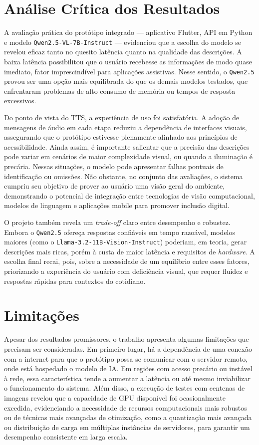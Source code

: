 \section{Análise Crítica dos Resultados}

A avaliação prática do protótipo integrado — aplicativo Flutter, API em Python e modelo \lstinline{Qwen2.5-VL-7B-Instruct} — evidenciou que a escolha do modelo se revelou eficaz tanto no quesito latência quanto na qualidade das descrições. A baixa latência possibilitou que o usuário recebesse as informações de modo quase imediato, fator imprescindível para aplicações assistivas. Nesse sentido, o \lstinline{Qwen2.5} provou ser uma opção mais equilibrada do que os demais modelos testados, que enfrentaram problemas de alto consumo de memória ou tempos de resposta excessivos.

Do ponto de vista do TTS, a experiência de uso foi satisfatória. A adoção de mensagens de áudio em cada etapa reduziu a dependência de interfaces visuais, assegurando que o protótipo estivesse plenamente alinhado aos princípios de acessibilidade. Ainda assim, é importante salientar que a precisão das descrições pode variar em cenários de maior complexidade visual, ou quando a iluminação é precária. Nessas situações, o modelo pode apresentar falhas pontuais de identificação ou omissões. Não obstante, no conjunto das avaliações, o sistema cumpriu seu objetivo de prover ao usuário uma visão geral do ambiente, demonstrando o potencial de integração entre tecnologias de visão computacional, modelos de linguagem e aplicações mobile para promover inclusão digital.

O projeto também revela um \textit{trade-off} claro entre desempenho e robustez. Embora o \lstinline{Qwen2.5} ofereça respostas confiáveis em tempo razoável, modelos maiores (como o \lstinline{Llama-3.2-11B-Vision-Instruct}) poderiam, em teoria, gerar descrições mais ricas, porém à custa de maior latência e requisitos de \textit{hardware}. A escolha final recai, pois, sobre a necessidade de um equilíbrio entre esses fatores, priorizando a experiência do usuário com deficiência visual, que requer fluidez e respostas rápidas para contextos do cotidiano.

\section{Limitações}

Apesar dos resultados promissores, o trabalho apresenta algumas limitações que precisam ser consideradas. Em primeiro lugar, há a dependência de uma conexão com a internet para que o protótipo possa se comunicar com o servidor remoto, onde está hospedado o modelo de IA. Em regiões com acesso precário ou instável à rede, essa característica tende a aumentar a latência ou até mesmo inviabilizar o funcionamento do sistema. Além disso, a execução de testes com centenas de imagens revelou que a capacidade de GPU disponível foi ocasionalmente excedida, evidenciando a necessidade de recursos computacionais mais robustos ou de técnicas mais avançadas de otimização, como a quantização mais avançada ou distribuição de carga em múltiplas instâncias de servidores, para garantir um desempenho consistente em larga escala.

